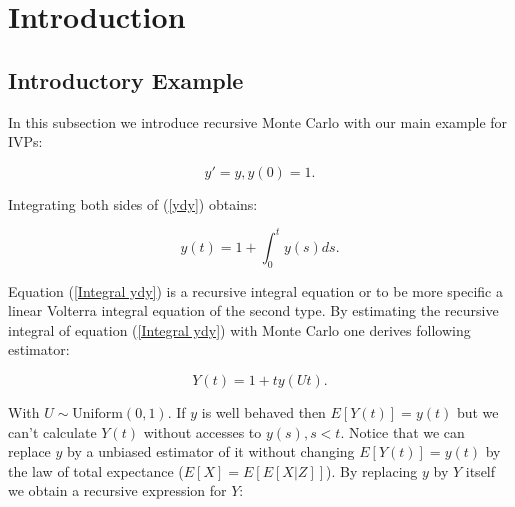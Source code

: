 \documentclass[a4paper,12pt]{article}
\begin{document}

\newpage
\tableofcontents
\newpage

\begin{abstract}
    We will write this at the end. Also need a dutch abstract
\end{abstract}

\section{Introduction}

\subsection{Introductory Example}
In this subsection we introduce recursive  Monte Carlo with our main example
for IVPs:

\begin{equation} \label{ydy}
    y'=y, y(0)=1.
\end{equation}

Integrating both sides of (\ref{ydy}) obtains:

\begin{equation} \label{Integral ydy}
    y(t) = 1 + \int_{0}^{t} y(s) ds.
\end{equation}

Equation (\ref{Integral ydy}) is a recursive integral equation or to be more specific
a linear Volterra integral equation of the second type. By estimating the recursive integral
of equation (\ref{Integral ydy}) with Monte Carlo one derives following estimator:

\begin{equation}
    Y(t) = 1 + t y(Ut).
\end{equation}

With $U \sim \text{Uniform}(0,1)$. If $y$ is well behaved then $E[Y(t)]=y(t)$ but we can't
calculate $Y(t)$ without accesses to $y(s),s<t$. Notice that we can replace $y$ by a
unbiased estimator of it without changing $E[Y(t)]=y(t)$ by the law of total expectance
($E[X] = E[E[X|Z]]$). By replacing $y$ by $Y$ itself we obtain a recursive expression for $Y$:
\end{document}
